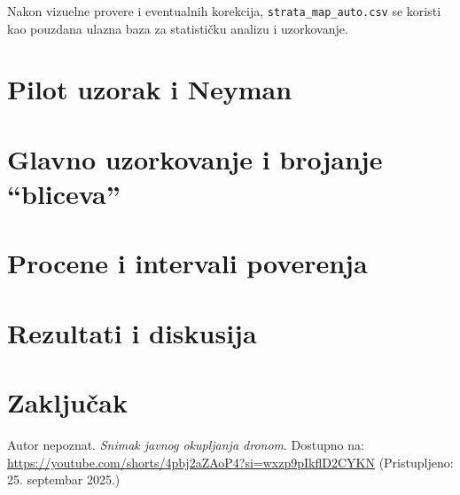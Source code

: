 \documentclass[a4paper,12pt]{article}
\begin{document}
\noindent
Nakon vizuelne provere i eventualnih korekcija, \texttt{strata\_map\_auto.csv} se koristi kao pouzdana ulazna baza za statističku analizu i uzorkovanje.

\section{Pilot uzorak i Neyman}

\section{Glavno uzorkovanje i brojanje “bliceva”}

\section{Procene i intervali poverenja}

\section{Rezultati i diskusija}

\section{Zaključak}


\newpage
\begin{thebibliography}{9}

	Autor nepoznat. 
	\textit{Snimak javnog okupljanja dronom}. 
	Dostupno na: \url{https://youtube.com/shorts/4pbj2aZAoP4?si=wxzp9pIkflD2CYKN} 
	(Pristupljeno: 25. septembar 2025.)
	
	\end{thebibliography}
\end{document}
